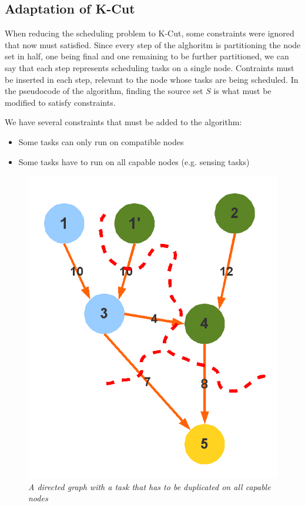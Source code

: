\subsection{Adaptation of K-Cut}
\label{sec:adapt} 

When reducing the scheduling problem to K-Cut, some constraints were ignored that now must satisfied. Since every step of the alghoritm is
partitioning the node set in half, one being final and one remaining to be further partitioned, we can say that each step represents scheduling
tasks on a single node. Contraints must be inserted in each step, relevant to the node whose tasks are being scheduled. In the pseudocode of
the algorithm, finding the source set $S$ is what must be modified to satisfy constraints.

We have several constraints that must be added to the algorithm:
\begin{itemize}
 \item Some tasks can only run on compatible nodes
 \item Some tasks have to run on all capable nodes (e.g. sensing tasks)
\end{itemize}

\begin{figure}[ht]
 \begin{center}
  \includegraphics[scale=0.3]{static/dag-cut-multiplier.png}
 \end{center}
 \caption{\small \itshape{A directed graph with a task that has to be duplicated on all capable nodes}}
\end{figure}

